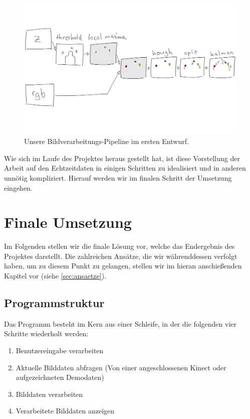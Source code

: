 \documentclass[12pt,a4paper,ngerman]{scrartcl}
\begin{document}
\begin{figure}[H]
    \centering
    \includegraphics[scale=0.14]{img/processing-pipeline.png}
    \caption{Unsere Bildverarbeitungs-Pipeline im ersten Entwurf.}
    \label{ourpipeline}
\end{figure}

Wie sich im Laufe des Projektes heraus gestellt hat, ist diese Vorstellung der Arbeit
auf den Echtzeitdaten in einigen Schritten zu idealisiert und in anderen unnötig
kompliziert. Hierauf werden wir im finalen Schritt der Umsetzung eingehen.

\section{Finale Umsetzung}
\label{sec:final}

Im Folgenden stellen wir die finale Lösung vor, welche das Endergebnis des
Projektes darstellt. Die zahlreichen Ansätze, die wir währenddessen verfolgt haben, um zu
diesem Punkt zu gelangen, stellen wir im hieran anschießenden Kapitel vor (siehe \ref{sec:ansaetze}).

\subsection{Programmstruktur}

Das Programm besteht im Kern aus einer Schleife, in der die folgenden vier Schritte  wiederholt werden:
\begin{enumerate}
  \item Benutzereingabe verarbeiten
  \item Aktuelle Bilddaten abfragen (Von einer angeschlossenen Kinect oder aufgezeichneten Demodaten)
  \item Bilddaten verarbeiten
  \item Verarbeitete Bilddaten anzeigen
\end{enumerate}
\end{document}
